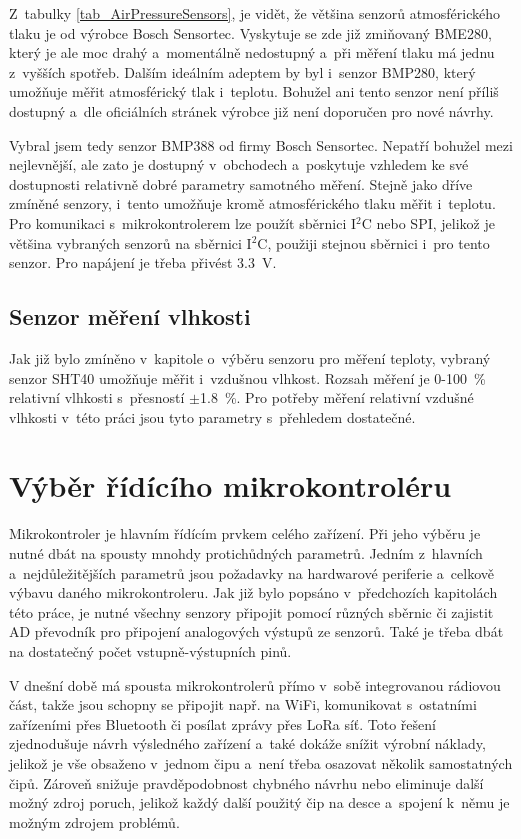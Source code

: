 Z~tabulky \ref{tab_AirPressureSensors}, je vidět, že většina senzorů atmosférického tlaku je od výrobce Bosch Sensortec. Vyskytuje se zde již zmiňovaný BME280, který je ale moc drahý a~momentálně nedostupný a~při měření tlaku má jednu z~vyšších spotřeb. Dalším ideálním adeptem by byl i~senzor BMP280, který umožňuje měřit atmosférický tlak i~teplotu. Bohužel ani tento senzor není příliš dostupný a~dle oficiálních stránek výrobce již není doporučen pro nové návrhy.

Vybral jsem tedy senzor BMP388 od firmy Bosch Sensortec. Nepatří bohužel mezi nejlevnější, ale zato je dostupný v~obchodech a~poskytuje vzhledem ke své dostupnosti relativně dobré parametry samotného měření. Stejně jako dříve zmíněné senzory, i~tento umožňuje kromě atmosférického tlaku měřit i~teplotu. Pro komunikaci s~mikrokontrolerem lze použít sběrnici I$^2$C nebo SPI, jelikož je většina vybraných senzorů na sběrnici I$^2$C, použiji stejnou sběrnici i~pro tento senzor. Pro napájení je třeba přivést \SI{3,3}{\volt}.

\subsection{Senzor měření vlhkosti}

Jak již bylo zmíněno v~kapitole o~výběru senzoru pro měření teploty, vybraný senzor SHT40 umožňuje měřit i~vzdušnou vlhkost. Rozsah měření je \SI{0}{}-\SI{100}{\percent} relativní vlhkosti s~přesností $\pm$\SI{1,8}{\percent}. Pro potřeby měření relativní vzdušné vlhkosti v~této práci jsou tyto parametry s~přehledem dostatečné.

\section{Výběr řídícího mikrokontroléru}

Mikrokontroler je hlavním řídícím prvkem celého zařízení. Při jeho výběru je nutné dbát na spousty mnohdy protichůdných parametrů. Jedním z~hlavních a~nejdůležitějších parametrů jsou požadavky na hardwarové periferie a~celkově výbavu daného mikrokontroleru. Jak již bylo popsáno v~předchozích kapitolách této práce, je nutné všechny senzory připojit pomocí různých sběrnic či zajistit AD převodník pro připojení analogových výstupů ze senzorů. Také je třeba dbát na dostatečný počet vstupně-výstupních pinů.

V dnešní době má spousta mikrokontrolerů přímo v~sobě integrovanou rádiovou část, takže jsou schopny se připojit např. na WiFi, komunikovat s~ostatními zařízeními přes Bluetooth či posílat zprávy přes LoRa síť. Toto řešení zjednodušuje návrh výsledného zařízení a~také dokáže snížit výrobní náklady, jelikož je vše obsaženo v~jednom čipu a~není třeba osazovat několik samostatných čipů. Zároveň snižuje pravděpodobnost chybného návrhu nebo eliminuje další možný zdroj poruch, jelikož každý další použitý čip na desce a~spojení k~němu je možným zdrojem problémů.

